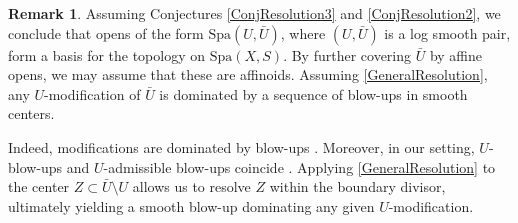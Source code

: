 \documentclass{amsart}
\def\Spa{\textrm{Spa}}
\theoremstyle{definition}
\newtheorem{remark}[theorem]{Remark}
\numberwithin{equation}{section}
\begin{document}
\begin{remark}\label{DescriptionOfOpens}
	Assuming Conjectures \ref{ConjResolution3} and \ref{ConjResolution2}, we conclude that opens of the form $\Spa(U, \bar{U})$, where $(U, \bar{U})$ is a log smooth pair, form a basis for the topology on $\Spa(X, S)$. By further covering $\bar{U}$ by affine opens, we may assume that these are affinoids. Assuming \cref{GeneralResolution}, any $U$-modification of $\bar{U}$ is dominated by a sequence of blow-ups in smooth centers.
	
	Indeed, modifications are dominated by blow-ups \cite[Corollary 3.4.8]{TemkinRZ}. Moreover, in our setting, $U$-blow-ups and $U$-admissible blow-ups coincide \cite[Remark 3.4.5(i)]{TemkinRZ}. Applying \cref{GeneralResolution} to the center $Z \subset \bar{U} \setminus U$ allows us to resolve $Z$ within the boundary divisor, ultimately yielding a smooth blow-up dominating any given $U$-modification.
\end{remark}


\printbibliography
\end{document}
